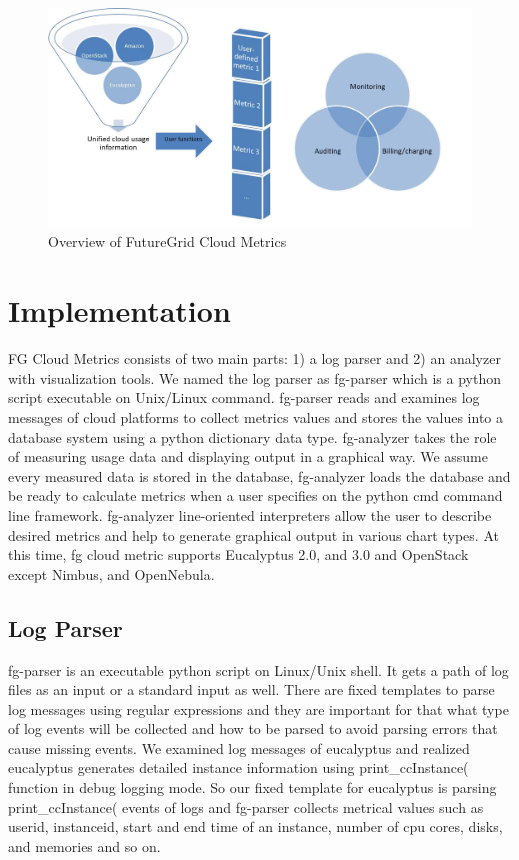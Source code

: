 \documentclass{sig-alternate}
\begin{document}
\begin{figure}[h!] 
  \centering 
    \includegraphics[width=1.0\columnwidth]{images/Picture1.pdf} 
  \caption{Overview of FutureGrid Cloud Metrics}\label{F:fig1} 
\end{figure} 


\section{Implementation} \label{S:implementation}

FG Cloud Metrics consists of two main parts: 1) a log parser and 2) an analyzer with visualization tools. We named the log parser as fg-parser which is a python script executable on Unix/Linux command. fg-parser reads and examines log messages of cloud platforms to collect metrics values and stores the values into a database system using a python dictionary data type. fg-analyzer takes the role of measuring usage data and displaying output in a graphical way. We assume every measured data is stored in the database, fg-analyzer loads the database and be ready to calculate metrics when a user specifies on the python cmd command line framework. fg-analyzer line-oriented interpreters allow the user to describe desired metrics and help to generate graphical output in various chart types. At this time, fg cloud metric supports Eucalyptus 2.0, and 3.0 and OpenStack except Nimbus, and OpenNebula.

\subsection{Log Parser}

fg-parser is an executable python script on Linux/Unix shell. It gets a path of log files as an input or a standard input as well. There are fixed templates to parse log messages using regular expressions and they are important for that what type of log events will be collected and how to be parsed to avoid parsing errors that cause missing events. We examined log messages of eucalyptus and realized eucalyptus generates detailed instance information using print\_ccInstance( function in debug logging mode. So our fixed template for eucalyptus is parsing print\_ccInstance( events of logs and fg-parser collects metrical values such as userid, instanceid, start and end time of an instance, number of cpu cores, disks, and memories and so on.
\end{document}
